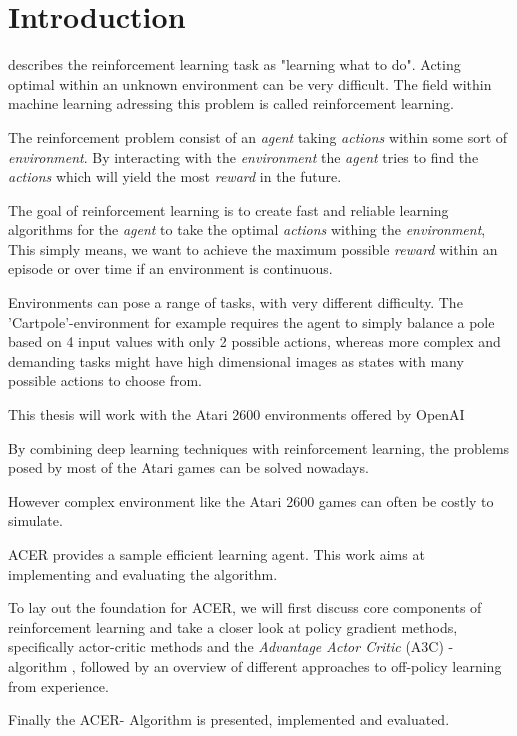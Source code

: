 \section{Introduction}\raggedbottom 
\citet{Sut98} describes the reinforcement learning  task as "learning what to do".
Acting optimal within an unknown environment can be very difficult.
The field within machine learning adressing this problem is called reinforcement learning.

The reinforcement problem consist of an \textit{agent} taking \textit{actions} within some sort of \textit{environment}.
By interacting with the \textit{environment} the \textit{agent} tries to find the \textit{actions} which will yield the most \textit{reward} in the future.

The goal of reinforcement learning is to create fast and reliable learning algorithms for the \textit{agent} to take the optimal \textit{actions} withing the \textit{environment}, This simply means, we want to achieve the maximum possible \textit{reward} within an episode or over time if an environment is continuous.

Environments can pose a range of tasks, with very different difficulty.
The 'Cartpole'-environment for example requires the agent to simply balance a pole based on 4 input values with only 2 possible actions, whereas more complex and demanding tasks might have high dimensional images as states with many possible actions to choose from.

This thesis will work with the Atari 2600 environments offered by OpenAI \citep{openaigym}

By combining deep learning techniques \citep{Hinton504} with reinforcement learning, the problems posed by most of the Atari games can be solved nowadays.

However complex environment like the Atari 2600 games can often be costly to simulate.

ACER \citep{ACER} provides a sample efficient learning agent. This work aims at implementing and evaluating the algorithm.

To lay out the foundation for ACER, we will first discuss core components of reinforcement learning and take a closer look at policy gradient methods, specifically actor-critic methods and the \textit{Advantage Actor Critic} (A3C) - algorithm \citep{A3C}, followed by an overview of different approaches to off-policy learning from experience.

Finally the ACER- Algorithm is presented, implemented and evaluated.


\pagebreak